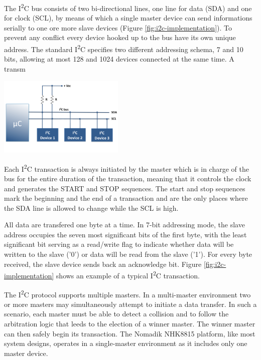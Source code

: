 \documentclass[a4paper,10pt]{article}
\makeatletter
\newenvironment{figurehere}{\def\@captype{figure}\vspace{2ex}}{\vspace{2ex}}
\newcommand{\icc}{I\textsuperscript{2}C }
\makeatother
\begin{document}
\begin{multicols}{2}
The \icc bus consists of two bi-directional lines, one line for data (SDA)
and one for clock (SCL), by means of which a single master device can send
informations serially to one ore more slave devices (Figure
\ref{fig:i2c-implementation}).
To prevent any conflict every device hooked up to the bus have its own unique
address. The standard \icc specifies two different addressing schema, 7 and
10 bits, allowing at most 128 and 1024 devices connected at the same time.
A transm

\begin{figurehere}
 \centering
 \includegraphics[width=6cm, height=3.8cm]{./figures/i2c-diagram.png}
 \caption{Sample \icc implementation (adapted from \emph{embedded-lab.com}).}
 \label{fig:i2c-implementation}
\end{figurehere}

Each \icc transaction is always initiated by the master which is in charge of
the bus for the entire duration of the transaction, meaning that it controls the
clock and generates the START and STOP sequences. The start and stop sequences
mark the beginning and the end of a transaction and are the only places where
the SDA line is allowed to change while the SCL is high.

All data are transfered one byte at a time. In 7-bit addressing mode, the slave
address occupies the seven most significant bits of the first byte, with the
least significant bit serving as a read/write flag to indicate whether data
will be written to the slave ('0') or data will be read from the slave ('1').
For every byte received, the slave device sends back an acknowledge bit.
Figure \ref{fig:i2c-implementation} shows an example of a typical \icc
transaction.

The \icc protocol supports multiple masters. In a multi-master environment two
or more masters may simultaneously attempt to initiate a data transfer.
In such a scenario, each master must be able to detect a collision and to follow
the arbitration logic that leeds to the election of a winner master. The winner
master can then safely begin its transaction.
The Nomadik NHK8815 platform, like most system designs, operates in a 
single-master environment as it includes only one master device.


\end{multicols}
\end{document}

